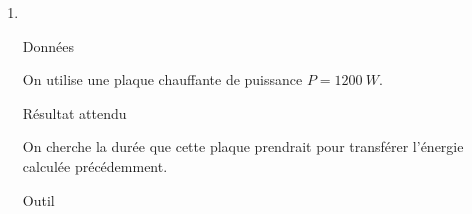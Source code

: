 \documentclass[../main/main.tex]{subfiles}
\begin{document}
\begin{enumerate}
\begin{tcbraster}[raster columns=2, raster equal height=rows]
\begin{tcolorbox}[blankest, raster multicolumn=1, space to=\myspace]
\begin{tcbraster}[raster columns=1]
\begin{NCrapp}[]{Outil}
                    \end{NCrapp}
                \end{tcbraster}
            \end{tcolorbox}
        \end{tcbraster}
        \begin{NCexem}[]{Application}
           L'énergie à apporter $Q$ se déduit de la dimension de la capacité
           thermique massique~: $[c] = [Q]\rm⋅M^{-1}⋅\Theta^{-1}$. En appelant
           $m$ la masse du volume d'eau, par cette analyse dimensionnelle on a
           \[\boxed{Q = mc\Delta T}\]
           On a donc
           \[Q = \SI{3.3e5}{J}\quad\text{avec}\quad \left\{
                   \begin{array}{rcl}
                       m & = & \SI{1}{kg}\\
                       c & = & \SI{4.18}{J.g^{-1}.K^{-1}}\\
                       c & = & \SI{4.18e3}{J.kg^{-1}.K^{-1}}\\
                       \Delta T & = & \SI{80}{K}
                   \end{array}
           \right.\]
           et pour utiliser le coût en euros, on la converti en \si{kWh}~:
           \[Q = \SI{9.3e-2}{kWh} = \SI{1.5e-2}{\EUR}\]
        \end{NCexem}
    \item ~
        \begin{tcbraster}[raster columns=2, raster equal height=rows]
            \begin{tcolorbox}[blankest, raster multicolumn=1, space to=\myspace]
                \begin{tcbraster}[raster columns=1]
                    \begin{NCdefi}[]{Données}

                        On utilise une plaque chauffante de puissance $P =
                        \SI{1200}{W}$.

                    \end{NCdefi}
                    \begin{NCprop}[]{Résultat attendu}

                        On cherche la durée que cette plaque prendrait pour
                        transférer l'énergie calculée précédemment.

                    \end{NCprop}
                    \begin{NCrapp}[]{Outil}


\end{NCrapp}
\end{tcbraster}
\end{tcolorbox}
\end{tcbraster}
\end{enumerate}
\end{document}
